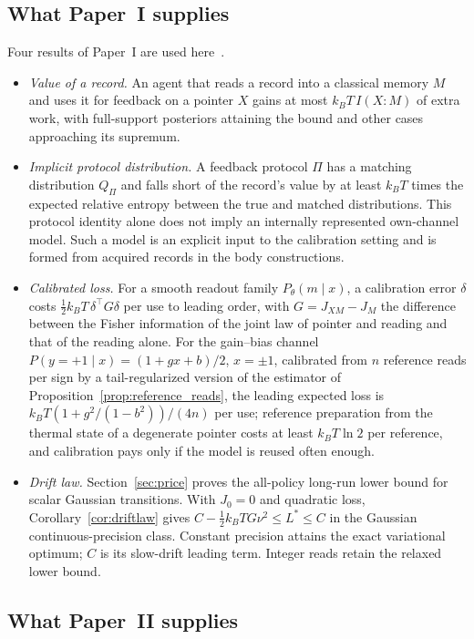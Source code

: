 \subsection{What Paper~I supplies}
\label{subsec:from_I}

Four results of Paper~I are used here~\cite{Liu2026TDOME_I}.
\begin{itemize}
\item \emph{Value of a record.} An agent that reads a record into a classical memory $M$ and uses it for feedback on a pointer $X$ gains at most $k_BT\,I(X{:}M)$ of extra work, with full-support posteriors attaining the bound and other cases approaching its supremum.
\item \emph{Implicit protocol distribution.} A feedback protocol $\Pi$ has a matching distribution $Q_\Pi$ and falls short of the record's value by at least $k_BT$ times the expected relative entropy between the true and matched distributions. This protocol identity alone does not imply an internally represented own-channel model. Such a model is an explicit input to the calibration setting and is formed from acquired records in the body constructions.
\item \emph{Calibrated loss.} For a smooth readout family $P_\theta(m\mid x)$, a calibration error $\delta$ costs $\tfrac12k_BT\,\delta^{\top}G\delta$ per use to leading order, with $G=J_{XM}-J_M$ the difference between the Fisher information of the joint law of pointer and reading and that of the reading alone. For the gain--bias channel $P(y=+1\mid x)=(1+gx+b)/2$, $x=\pm1$, calibrated from $n$ reference reads per sign by a tail-regularized version of the estimator of Proposition~\ref{prop:reference_reads}, the leading expected loss is $k_BT(1+g^2/(1-b^2))/(4n)$ per use; reference preparation from the thermal state of a degenerate pointer costs at least $k_BT\ln2$ per reference, and calibration pays only if the model is reused often enough.
\item \emph{Drift law.} Section~\ref{sec:price} proves the all-policy long-run lower bound for scalar Gaussian transitions. With $J_0=0$ and quadratic loss, Corollary~\ref{cor:driftlaw} gives $C-\tfrac12k_BTG\nu^2\le L^*\le C$ in the Gaussian continuous-precision class. Constant precision attains the exact variational optimum; $C$ is its slow-drift leading term. Integer reads retain the relaxed lower bound.
\end{itemize}

\subsection{What Paper~II supplies}
\label{subsec:from_II}

